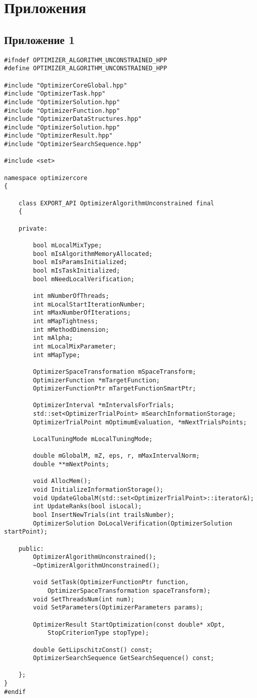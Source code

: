 \section{Приложения}
\subsection{Приложение 1}
\label{attach1}

\begin{lstlisting}[frame=single]
#ifndef OPTIMIZER_ALGORITHM_UNCONSTRAINED_HPP
#define OPTIMIZER_ALGORITHM_UNCONSTRAINED_HPP

#include "OptimizerCoreGlobal.hpp"
#include "OptimizerTask.hpp"
#include "OptimizerSolution.hpp"
#include "OptimizerFunction.hpp"
#include "OptimizerDataStructures.hpp"
#include "OptimizerSolution.hpp"
#include "OptimizerResult.hpp"
#include "OptimizerSearchSequence.hpp"

#include <set>

namespace optimizercore
{

	class EXPORT_API OptimizerAlgorithmUnconstrained final
	{

	private:

		bool mLocalMixType;
		bool mIsAlgorithmMemoryAllocated;
		bool mIsParamsInitialized;
		bool mIsTaskInitialized;
		bool mNeedLocalVerification;

		int mNumberOfThreads;
		int mLocalStartIterationNumber;
		int mMaxNumberOfIterations;
		int mMapTightness;
		int mMethodDimension;
		int mAlpha;
		int mLocalMixParameter;
		int mMapType;

		OptimizerSpaceTransformation mSpaceTransform;
		OptimizerFunction *mTargetFunction;
		OptimizerFunctionPtr mTargetFunctionSmartPtr;

		OptimizerInterval *mIntervalsForTrials;
		std::set<OptimizerTrialPoint> mSearchInformationStorage;
		OptimizerTrialPoint mOptimumEvaluation, *mNextTrialsPoints;

		LocalTuningMode mLocalTuningMode;

		double mGlobalM, mZ, eps, r, mMaxIntervalNorm;
		double **mNextPoints;

		void AllocMem();
		void InitializeInformationStorage();
		void UpdateGlobalM(std::set<OptimizerTrialPoint>::iterator&);
		int UpdateRanks(bool isLocal);
		bool InsertNewTrials(int trailsNumber);
		OptimizerSolution DoLocalVerification(OptimizerSolution startPoint);

	public:
		OptimizerAlgorithmUnconstrained();
		~OptimizerAlgorithmUnconstrained();

		void SetTask(OptimizerFunctionPtr function,
			OptimizerSpaceTransformation spaceTransform);
		void SetThreadsNum(int num);
		void SetParameters(OptimizerParameters params);

		OptimizerResult StartOptimization(const double* xOpt,
			StopCriterionType stopType);

		double GetLipschitzConst() const;
		OptimizerSearchSequence GetSearchSequence() const;

	};
}
#endif
\end{lstlisting}
